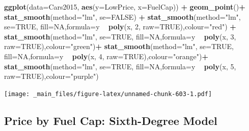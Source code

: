 \documentclass[]{book}
\newenvironment{Shaded}{\begin{snugshade}}{\end{snugshade}}
\newcommand{\KeywordTok}[1]{\textcolor[rgb]{0.13,0.29,0.53}{\textbf{#1}}}
\newcommand{\DataTypeTok}[1]{\textcolor[rgb]{0.13,0.29,0.53}{#1}}
\newcommand{\DecValTok}[1]{\textcolor[rgb]{0.00,0.00,0.81}{#1}}
\newcommand{\StringTok}[1]{\textcolor[rgb]{0.31,0.60,0.02}{#1}}
\newcommand{\OtherTok}[1]{\textcolor[rgb]{0.56,0.35,0.01}{#1}}
\newcommand{\OperatorTok}[1]{\textcolor[rgb]{0.81,0.36,0.00}{\textbf{#1}}}
\newcommand{\NormalTok}[1]{#1}
\begin{document}
\begin{Shaded}
\begin{Highlighting}[]
\KeywordTok{ggplot}\NormalTok{(}\DataTypeTok{data=}\NormalTok{Cars2015, }\KeywordTok{aes}\NormalTok{(}\DataTypeTok{y=}\NormalTok{LowPrice, }\DataTypeTok{x=}\NormalTok{FuelCap)) }\OperatorTok{+}\StringTok{ }\KeywordTok{geom_point}\NormalTok{()}\OperatorTok{+}\StringTok{ }\KeywordTok{stat_smooth}\NormalTok{(}\DataTypeTok{method=}\StringTok{"lm"}\NormalTok{, }\DataTypeTok{se=}\OtherTok{FALSE}\NormalTok{) }\OperatorTok{+}\StringTok{ }\KeywordTok{stat_smooth}\NormalTok{(}\DataTypeTok{method=}\StringTok{"lm"}\NormalTok{, }\DataTypeTok{se=}\OtherTok{TRUE}\NormalTok{, }\DataTypeTok{fill=}\OtherTok{NA}\NormalTok{,}\DataTypeTok{formula=}\NormalTok{y }\OperatorTok{~}\StringTok{ }\KeywordTok{poly}\NormalTok{(x, }\DecValTok{2}\NormalTok{, }\DataTypeTok{raw=}\OtherTok{TRUE}\NormalTok{),}\DataTypeTok{colour=}\StringTok{"red"}\NormalTok{) }\OperatorTok{+}\StringTok{ }
\StringTok{  }\KeywordTok{stat_smooth}\NormalTok{(}\DataTypeTok{method=}\StringTok{"lm"}\NormalTok{, }\DataTypeTok{se=}\OtherTok{TRUE}\NormalTok{, }\DataTypeTok{fill=}\OtherTok{NA}\NormalTok{,}\DataTypeTok{formula=}\NormalTok{y }\OperatorTok{~}\StringTok{ }\KeywordTok{poly}\NormalTok{(x, }\DecValTok{3}\NormalTok{, }\DataTypeTok{raw=}\OtherTok{TRUE}\NormalTok{),}\DataTypeTok{colour=}\StringTok{"green"}\NormalTok{)}\OperatorTok{+}\StringTok{ }
\StringTok{  }\KeywordTok{stat_smooth}\NormalTok{(}\DataTypeTok{method=}\StringTok{"lm"}\NormalTok{, }\DataTypeTok{se=}\OtherTok{TRUE}\NormalTok{, }\DataTypeTok{fill=}\OtherTok{NA}\NormalTok{,}\DataTypeTok{formula=}\NormalTok{y }\OperatorTok{~}\StringTok{ }\KeywordTok{poly}\NormalTok{(x, }\DecValTok{4}\NormalTok{, }\DataTypeTok{raw=}\OtherTok{TRUE}\NormalTok{),}\DataTypeTok{colour=}\StringTok{"orange"}\NormalTok{)}\OperatorTok{+}\StringTok{ }
\StringTok{  }\KeywordTok{stat_smooth}\NormalTok{(}\DataTypeTok{method=}\StringTok{"lm"}\NormalTok{, }\DataTypeTok{se=}\OtherTok{TRUE}\NormalTok{, }\DataTypeTok{fill=}\OtherTok{NA}\NormalTok{,}\DataTypeTok{formula=}\NormalTok{y }\OperatorTok{~}\StringTok{ }\KeywordTok{poly}\NormalTok{(x, }\DecValTok{5}\NormalTok{, }\DataTypeTok{raw=}\OtherTok{TRUE}\NormalTok{),}\DataTypeTok{colour=}\StringTok{"purple"}\NormalTok{)}
\end{Highlighting}
\end{Shaded}

\texttt{[image: \_main\_files/figure-latex/unnamed-chunk-603-1.pdf]}

\subsection{Price by Fuel Cap: Sixth-Degree
Model}\label{price-by-fuel-cap-sixth-degree-model}
\end{document}
